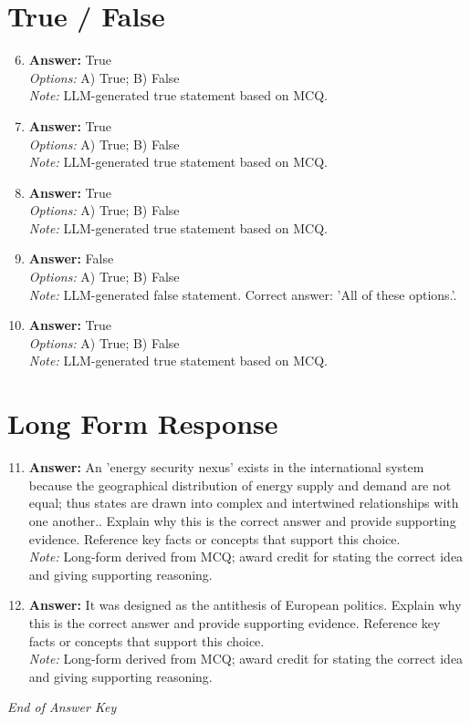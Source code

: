 \documentclass[12pt]{article}
\begin{document}
\section*{True / False}
\begin{enumerate}[label=\arabic*.]
\setcounter{enumi}{5}
\item \textbf{Answer:} True
\\ \textit{Options:} A) True; B) False
\\ \textit{Note:} LLM-generated true statement based on MCQ.
\item \textbf{Answer:} True
\\ \textit{Options:} A) True; B) False
\\ \textit{Note:} LLM-generated true statement based on MCQ.
\item \textbf{Answer:} True
\\ \textit{Options:} A) True; B) False
\\ \textit{Note:} LLM-generated true statement based on MCQ.
\item \textbf{Answer:} False
\\ \textit{Options:} A) True; B) False
\\ \textit{Note:} LLM-generated false statement. Correct answer: 'All of these options.'.
\item \textbf{Answer:} True
\\ \textit{Options:} A) True; B) False
\\ \textit{Note:} LLM-generated true statement based on MCQ.
\end{enumerate}

\section*{Long Form Response}
\begin{enumerate}[label=\arabic*.]
\setcounter{enumi}{10}
\item \textbf{Answer:} An 'energy security nexus' exists in the international system because the geographical distribution of energy supply and demand are not equal; thus states are drawn into complex and intertwined relationships with one another.. Explain why this is the correct answer and provide supporting evidence. Reference key facts or concepts that support this choice.
\\ \textit{Note:} Long-form derived from MCQ; award credit for stating the correct idea and giving supporting reasoning.
\item \textbf{Answer:} It was designed as the antithesis of European politics. Explain why this is the correct answer and provide supporting evidence. Reference key facts or concepts that support this choice.
\\ \textit{Note:} Long-form derived from MCQ; award credit for stating the correct idea and giving supporting reasoning.
\end{enumerate}

\vfill
\noindent\textit{End of Answer Key}
\end{document}
